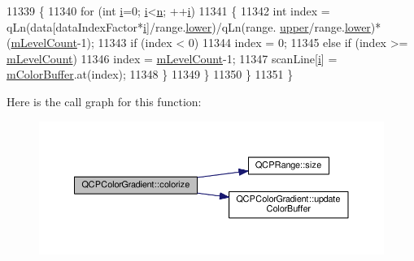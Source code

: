 \begin{DoxyCode}
11339     \{
11340       \textcolor{keywordflow}{for} (\textcolor{keywordtype}{int} \hyperlink{_comparision_pictures_2_createtest_image_8m_a6f6ccfcf58b31cb6412107d9d5281426}{i}=0; \hyperlink{_comparision_pictures_2_createtest_image_8m_a6f6ccfcf58b31cb6412107d9d5281426}{i}<\hyperlink{_comparision_pictures_2_createtest_image_8m_aeab71244afb687f16d8c4f5ee9d6ef0e}{n}; ++\hyperlink{_comparision_pictures_2_createtest_image_8m_a6f6ccfcf58b31cb6412107d9d5281426}{i})
11341       \{
11342         \textcolor{keywordtype}{int} index = qLn(data[dataIndexFactor*\hyperlink{_comparision_pictures_2_createtest_image_8m_a6f6ccfcf58b31cb6412107d9d5281426}{i}]/range.\hyperlink{class_q_c_p_range_aa3aca3edb14f7ca0c85d912647b91745}{lower})/qLn(range.
      \hyperlink{class_q_c_p_range_ae44eb3aafe1d0e2ed34b499b6d2e074f}{upper}/range.\hyperlink{class_q_c_p_range_aa3aca3edb14f7ca0c85d912647b91745}{lower})*(\hyperlink{class_q_c_p_color_gradient_a98fb68e359904b2c991fcae3e38a211a}{mLevelCount}-1);
11343         \textcolor{keywordflow}{if} (index < 0)
11344           index = 0;
11345         \textcolor{keywordflow}{else} \textcolor{keywordflow}{if} (index >= \hyperlink{class_q_c_p_color_gradient_a98fb68e359904b2c991fcae3e38a211a}{mLevelCount})
11346           index = \hyperlink{class_q_c_p_color_gradient_a98fb68e359904b2c991fcae3e38a211a}{mLevelCount}-1;
11347         scanLine[\hyperlink{_comparision_pictures_2_createtest_image_8m_a6f6ccfcf58b31cb6412107d9d5281426}{i}] = \hyperlink{class_q_c_p_color_gradient_af8b5f0739faa5f8295154d47ce38ecff}{mColorBuffer}.at(index);
11348       \}
11349     \}
11350   \}
11351 \}
\end{DoxyCode}


Here is the call graph for this function\+:\nopagebreak
\begin{figure}[H]
\begin{center}
\leavevmode
\includegraphics[width=350pt]{class_q_c_p_color_gradient_aaf423ceb943e177b0ed2c48c811d83dc_cgraph}
\end{center}
\end{figure}




